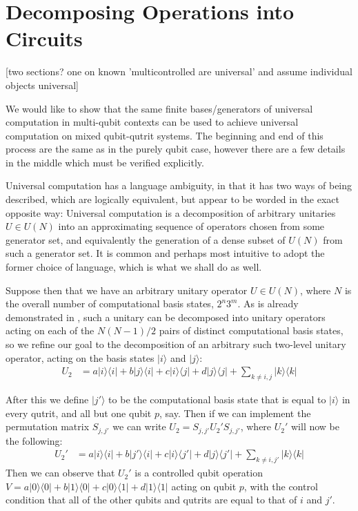 \documentclass[]{article}
\newcommand{\bra}[1]{\langle #1 |}
\newcommand{\ket}[1]{| #1 \rangle}
\begin{document}
\section{Decomposing Operations into Circuits}
[two sections? one on known 'multicontrolled are universal' and assume individual objects universal]

We would like to show that the same finite bases/generators of universal computation in multi-qubit contexts can be used to achieve universal computation on mixed qubit-qutrit systems. The beginning and end of this process are the same as in the purely qubit case, however there are a few details in the middle which  must be verified explicitly.

Universal computation has a language ambiguity, in that it has two ways of being described, which are logically equivalent, but appear to be worded in the exact opposite way: Universal computation is a decomposition of arbitrary unitaries $U \in U(N)$ into an approximating sequence of operators chosen from some generator set, and equivalently the generation of a dense subset of $U(N)$ from such a generator set. It is common and perhaps most intuitive to adopt the former choice of language, which is what we shall do as well.

Suppose then that we have an arbitrary unitary operator $U \in U(N)$, where $N$ is the overall number of computational basis states, $2^n3^m$. As is already demonstrated in \cite{textbook}, such a unitary can be decomposed into unitary operators acting on each of the $N(N-1)/2$ pairs of distinct computational basis states, so we refine our goal to the decomposition of an arbitrary such two-level unitary operator, acting on the basis states $\ket{i}$ and $\ket{j}$:
\begin{align*}
U_2 &= a\ket{i}\bra{i} + b\ket{j}\bra{i} + c\ket{i}\bra{j} + d\ket{j}\bra{j} + \sum_{k \neq i, j} \ket{k}\bra{k}
\end{align*}

After this we define $\ket{j'}$ to be the computational basis state that is equal to $\ket{i}$ in every qutrit, and all but one qubit $p$, say. Then if we can implement the permutation matrix $S_{j,j'}$ we can write $U_2 = S_{j,j'}U_2'S_{j,j'}$, where $U_2'$ will now be the following:
\begin{align*}
U_2' &= a\ket{i}\bra{i} + b\ket{j'}\bra{i} + c\ket{i}\bra{j'} + d\ket{j}\bra{j'} + \sum_{k \neq i, j'} \ket{k}\bra{k}
\end{align*}
Then we can observe that $U_2'$ is a controlled qubit operation $V = a\ket{0}\bra{0} + b\ket{1}\bra{0} + c\ket{0}\bra{1} + d\ket{1}\bra{1}$ acting on qubit $p$, with the control condition that all of the other qubits and qutrits are equal to that of $i$ and $j'$.
\end{document}
